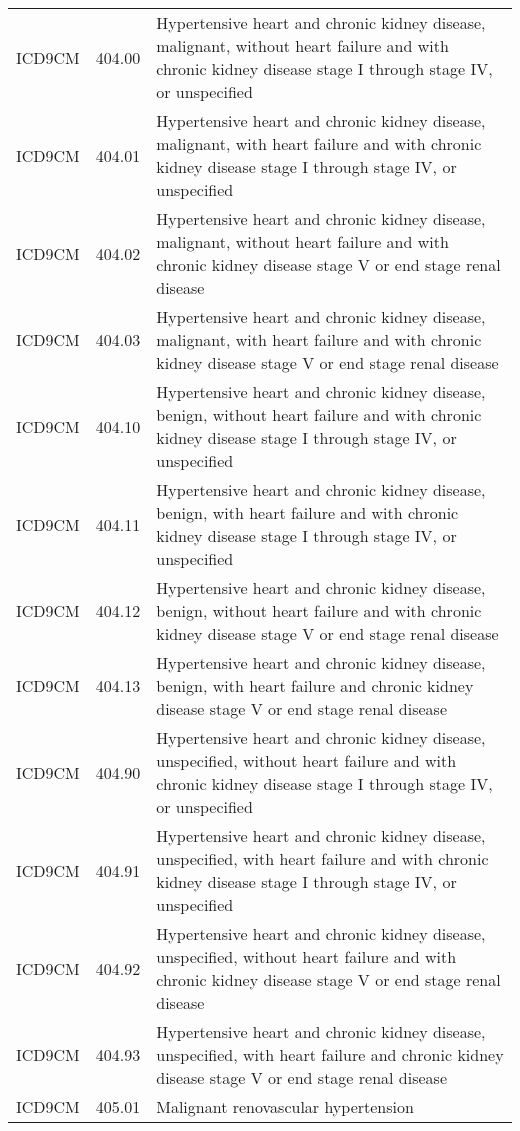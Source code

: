 \begin{longtable}{p{}p{}p{}}
  ICD9CM & 404.00 & Hypertensive heart and chronic kidney disease, malignant, without heart failure and with chronic kidney disease stage I through stage IV, or unspecified \\ 
  ICD9CM & 404.01 & Hypertensive heart and chronic kidney disease, malignant, with heart failure and with chronic kidney disease stage I through stage IV, or unspecified \\ 
  ICD9CM & 404.02 & Hypertensive heart and chronic kidney disease, malignant, without heart failure and with chronic kidney disease stage V or end stage renal disease \\ 
  ICD9CM & 404.03 & Hypertensive heart and chronic kidney disease, malignant, with heart failure and with chronic kidney disease stage V or end stage renal disease \\ 
  ICD9CM & 404.10 & Hypertensive heart and chronic kidney disease, benign, without heart failure and with chronic kidney disease stage I through stage IV, or unspecified \\ 
  ICD9CM & 404.11 & Hypertensive heart and chronic kidney disease, benign, with heart failure and with chronic kidney disease stage I through stage IV, or unspecified \\ 
  ICD9CM & 404.12 & Hypertensive heart and chronic kidney disease, benign, without heart failure and with chronic kidney disease stage V or end stage renal disease \\ 
  ICD9CM & 404.13 & Hypertensive heart and chronic kidney disease, benign, with heart failure and chronic kidney disease stage V or end stage renal disease \\ 
  ICD9CM & 404.90 & Hypertensive heart and chronic kidney disease, unspecified, without heart failure and with chronic kidney disease stage I through stage IV, or unspecified \\ 
  ICD9CM & 404.91 & Hypertensive heart and chronic kidney disease, unspecified, with heart failure and with chronic kidney disease stage I through stage IV, or unspecified \\ 
  ICD9CM & 404.92 & Hypertensive heart and chronic kidney disease, unspecified, without heart failure and with chronic kidney disease stage V or end stage renal disease \\ 
  ICD9CM & 404.93 & Hypertensive heart and chronic kidney disease, unspecified, with heart failure and chronic kidney disease stage V or end stage renal disease \\ 
  ICD9CM & 405.01 & Malignant renovascular hypertension \\ 

\end{longtable}
